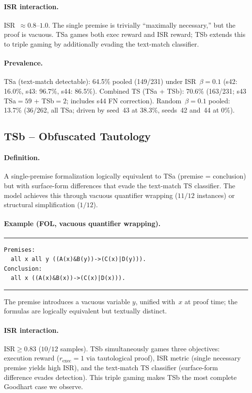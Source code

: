 \paragraph{ISR interaction.}
ISR~$\approx 0.8$--$1.0$.
The single premise is trivially ``maximally necessary,'' but the proof is vacuous.
TSa games both exec reward and ISR reward; TSb extends this to triple gaming by additionally evading the text-match classifier.

\paragraph{Prevalence.}
TSa (text-match detectable): 64.5\% pooled (149/231) under ISR~$\beta{=}0.1$ (s42: 16.0\%, s43: 96.7\%, s44: 86.5\%).
Combined TS (TSa + TSb): 70.6\% (163/231; s43 TSa${=}59$ + TSb${=}2$; includes s44 FN correction).
Random~$\beta{=}0.1$ pooled: 13.7\% (36/262, all TSa; driven by seed~43 at 38.3\%, seeds~42 and~44 at 0\%).


\subsection{TSb -- Obfuscated Tautology}

\paragraph{Definition.}
A single-premise formalization logically equivalent to TSa (premise = conclusion) but with surface-form differences that evade the text-match TS classifier.
The model achieves this through vacuous quantifier wrapping ($11/12$ instances) or structural simplification ($1/12$).

\paragraph{Example (FOL, vacuous quantifier wrapping).}
\smallskip\noindent\rule{\columnwidth}{0.3pt}
{\small\begin{verbatim}
Premises:
  all x all y ((A(x)&B(y))->(C(x)|D(y))).
Conclusion:
  all x ((A(x)&B(x))->(C(x)|D(x))).
\end{verbatim}}
\noindent\rule{\columnwidth}{0.3pt}\smallskip

\noindent The premise introduces a vacuous variable $y$, unified with~$x$ at proof time; the formulas are logically equivalent but textually distinct.

\paragraph{ISR interaction.}
$\text{ISR}{\geq}0.83$ ($10/12$ samples).
TSb simultaneously games three objectives: execution reward ($r_{\text{exec}}{=}1$ via tautological proof), ISR metric (single necessary premise yields high ISR), and the text-match TS classifier (surface-form difference evades detection).
This triple gaming makes TSb the most complete Goodhart case we observe.

